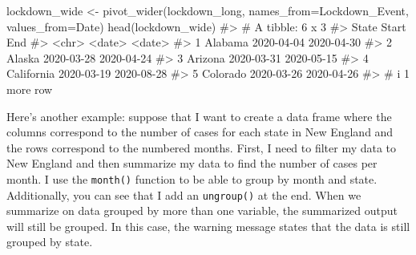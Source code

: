 \documentclass[
  letterpaper,
]{krantz}
\makeatletter
\newenvironment{Shaded}{\begin{snugshade}}{\end{snugshade}}
\newcommand{\AttributeTok}[1]{\textcolor[rgb]{0.40,0.45,0.13}{#1}}
\newcommand{\CommentTok}[1]{\textcolor[rgb]{0.37,0.37,0.37}{#1}}
\newcommand{\FunctionTok}[1]{\textcolor[rgb]{0.28,0.35,0.67}{#1}}
\newcommand{\NormalTok}[1]{\textcolor[rgb]{0.00,0.23,0.31}{#1}}
\newcommand{\OtherTok}[1]{\textcolor[rgb]{0.00,0.23,0.31}{#1}}
\newenvironment{kframe}{%
\medskip{}
\setlength{\fboxsep}{.8em}
 \def\at@end@of@kframe{}%
 \ifinner\ifhmode%
  \def\at@end@of@kframe{\end{minipage}}%
  \begin{minipage}{\columnwidth}%
 \fi\fi%
 \def\FrameCommand##1{\hskip\@totalleftmargin \hskip-\fboxsep
 \colorbox{shadecolor}{##1}\hskip-\fboxsep
     \hskip-\linewidth \hskip-\@totalleftmargin \hskip\columnwidth}%
 \MakeFramed {\advance\hsize-\width
   \@totalleftmargin\z@ \linewidth\hsize
   \@setminipage}}%
 {\par\unskip\endMakeFramed%
 \at@end@of@kframe}
\renewenvironment{Shaded}{\begin{kframe}}{\end{kframe}}
\makeatother
\begin{document}
\begin{Shaded}
\begin{Highlighting}[]
\NormalTok{lockdown\_wide }\OtherTok{\textless{}{-}} \FunctionTok{pivot\_wider}\NormalTok{(lockdown\_long, }\AttributeTok{names\_from=}\NormalTok{Lockdown\_Event, }
                             \AttributeTok{values\_from=}\NormalTok{Date)}
\FunctionTok{head}\NormalTok{(lockdown\_wide)}
\CommentTok{\#\textgreater{} \# A tibble: 6 x 3}
\CommentTok{\#\textgreater{}   State      Start      End       }
\CommentTok{\#\textgreater{}   \textless{}chr\textgreater{}      \textless{}date\textgreater{}     \textless{}date\textgreater{}    }
\CommentTok{\#\textgreater{} 1 Alabama    2020{-}04{-}04 2020{-}04{-}30}
\CommentTok{\#\textgreater{} 2 Alaska     2020{-}03{-}28 2020{-}04{-}24}
\CommentTok{\#\textgreater{} 3 Arizona    2020{-}03{-}31 2020{-}05{-}15}
\CommentTok{\#\textgreater{} 4 California 2020{-}03{-}19 2020{-}08{-}28}
\CommentTok{\#\textgreater{} 5 Colorado   2020{-}03{-}26 2020{-}04{-}26}
\CommentTok{\#\textgreater{} \# i 1 more row}
\end{Highlighting}
\end{Shaded}

Here's another example: suppose that I want to create a data frame where
the columns correspond to the number of cases for each state in New
England and the rows correspond to the numbered months. First, I need to
filter my data to New England and then summarize my data to find the
number of cases per month. I use the \texttt{month()} function to be
able to group by month and state. Additionally, you can see that I add
an \texttt{ungroup()} at the end. When we summarize on data grouped by
more than one variable, the summarized output will still be grouped. In
this case, the warning message states that the data is still grouped by
state.
\end{document}
